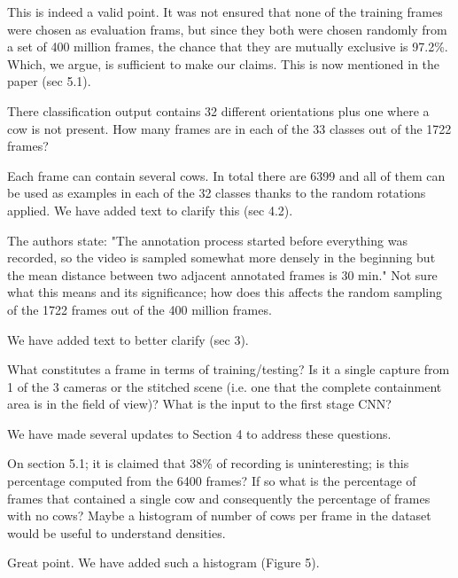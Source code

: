 \documentclass[10pt,a4paper]{letter}
\begin{document}
\begin{letter}{}
This is indeed a valid point. It was not ensured that none of the training frames were chosen as evaluation frams, but
since they both were chosen randomly from a set of 400 million frames, the
chance that they are mutually exclusive is 97.2\%. Which, we argue, is sufficient to make our claims. 
This is now mentioned in the paper (sec 5.1).

\begin{siderules}
There classification output contains 32 different orientations plus one where a cow is not present. How many frames are in each of the 33 classes 
out of the 1722 frames?
\end{siderules}

Each frame can contain several cows. In total there are 6399 and all of them
can be used as examples in each of the 32 classes thanks to the random
rotations applied. We have added text to clarify this (sec 4.2).

\begin{siderules}
The authors state: "The annotation process started before everything was recorded, so the video is sampled somewhat more densely in the beginning but 
the mean distance between two adjacent annotated frames is 30 min." Not sure what this means and its significance; how does this affects the random 
sampling of the 1722 frames out of the 400 million frames.
\end{siderules}

We have added text to better clarify (sec 3).

\begin{siderules}
What constitutes a frame in terms of training/testing? Is it a single capture from 1 of the 3 cameras or the stitched scene (i.e. one that the complete 
containment area is in the field of view)? What is the input to the first stage CNN?
\end{siderules}

We have made several updates to Section 4 to address these questions.

\begin{siderules}
On section 5.1; it is claimed that 38\% of recording is uninteresting; is this percentage computed from the 6400 frames? If so what is the percentage of 
frames that contained a single cow and consequently the percentage of frames with no cows? Maybe a histogram of number of cows per frame in the dataset 
would be useful to understand densities. 
\end{siderules}

Great point. We have added such a histogram (Figure 5).


\end{letter}
\end{document}
